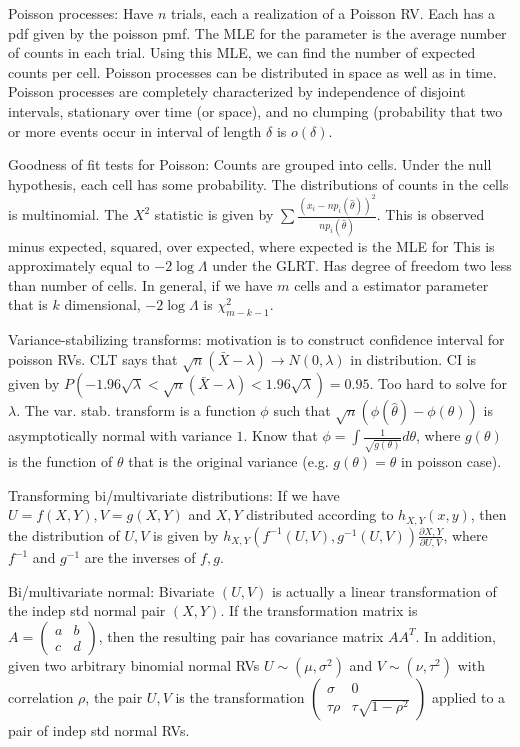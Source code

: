 \documentclass{article}
\newcommand{\openm}{\begin{pmatrix}}
\newcommand{\closem}{\end{pmatrix}}
\begin{document}
Poisson processes: Have $n$ trials, each a realization of a Poisson RV. Each has a pdf given by the poisson pmf. The MLE for the parameter is the average number of counts in each trial. Using this MLE, we can find the number of expected counts per cell. Poisson processes can be distributed in space as well as in time. Poisson processes are completely characterized by independence of disjoint intervals, stationary over time (or space), and no clumping (probability that two or more events occur in interval of length $\delta$ is $o(\delta)$.

Goodness of fit tests for Poisson: Counts are grouped into cells. Under the null hypothesis, each cell has some probability. The distributions of counts in the cells is multinomial. The $X^2$ statistic is given by $\sum\frac{(x_i-np_i(\hat{\theta}))^2}{np_i(\hat{\theta})}$. This is observed minus expected, squared, over expected, where expected is the MLE for  This is approximately equal to $-2\log\Lambda$ under the GLRT. Has degree of freedom two less than number of cells. In general, if we have $m$ cells and a estimator parameter that is $k$ dimensional, $-2\log\Lambda$ is $\chi^2_{m-k-1}$. 

Variance-stabilizing transforms: motivation is to construct confidence interval for poisson RVs. CLT says that $\sqrt{n}(\bar{X}-\lambda)\to N(0,\lambda)$ in distribution. CI is given by $P(-1.96\sqrt{\lambda}<\sqrt{n}(\bar{X}-\lambda)<1.96\sqrt{\lambda})=0.95$. Too hard to solve for $\lambda$. The var. stab. transform is a function $\phi$ such that $\sqrt{n}(\phi(\hat{\theta})-\phi(\theta))$ is asymptotically normal with variance $1$. Know that $\phi=\int\frac{1}{\sqrt{g(\theta)}}d\theta$, where $g(\theta)$ is the function of $\theta$ that is the original variance (e.g. $g(\theta)=\theta$ in poisson case).

Transforming bi/multivariate distributions: If we have $U=f(X,Y),V=g(X,Y)$ and $X,Y$ distributed according to $h_{X,Y}(x,y)$, then the distribution of $U,V$ is given by $h_{X,Y}(f^{-1}(U,V),g^{-1}(U,V))\frac{\partial X,Y}{\partial U,V}$, where $f^{-1}$ and $g^{-1}$ are the inverses of $f,g$. 

Bi/multivariate normal: Bivariate $(U,V)$ is actually a linear transformation of the indep std normal pair $(X,Y)$. If the transformation matrix is $A=\openm a&b\\c&d\closem$, then the resulting pair has covariance matrix $AA^T$. In addition, given two arbitrary binomial normal RVs $U\sim(\mu,\sigma^2)$ and $V\sim(\nu,\tau^2)$ with correlation $\rho$, the pair $U,V$ is the transformation $\openm\sigma &0\\\tau\rho &\tau\sqrt{1-\rho^2}\closem$ applied to a pair of indep std normal RVs. 
\end{document}
